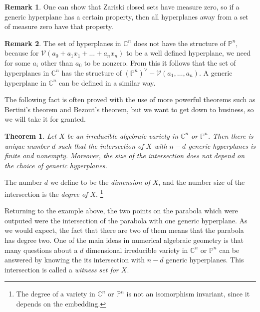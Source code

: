 \documentclass[12pt]{article}
\newtheorem{theorem}{Theorem}[section]
\theoremstyle{definition}
\newtheorem{remark}{Remark}[section]
\newcommand{\C}{\mathbb{C}}
\newcommand{\PP}{\mathbb{P}}
\begin{document}
\begin{remark}
   One can show that Zariski closed sets have measure zero, so if a 
   generic hyperplane has a certain property, then all hyperplanes away 
   from a set of measure zero have that property.
\end{remark}
\begin{remark}
   The set of hyperplanes in $\C^n$ does not have the structure of 
   $\PP^n$, because for $\mathcal{V}(a_0 + a_1x_1 + \ldots + a_nx_n)$ to 
   be a well defined hyperplane, we need for some $a_i$ other than $a_0$ 
   to be nonzero. From this it follows that the set of hyperplanes in 
   $\C^n$ has the structure of $(\PP^n)^\vee - \mathcal{V}(a_1, \ldots, 
   a_n)$. A generic hyperplane in $\C^n$ can be defined in a similar 
   way.
\end{remark}

The following fact is often proved with the use of more powerful 
theorems such as Bertini's theorem and Bezout's theorem, but we want to 
get down to business, so we will take it for granted.

\begin{theorem}
   Let $X$ be an irreducible algebraic variety in $\C^n$ or $\PP^n$. 
   Then there is unique number $d$ such that the intersection of $X$ 
   with $n-d$ generic hyperplanes is finite and nonempty. Moreover, the 
   size of the intersection does not depend on the choice of generic 
   hyperplanes.
\end{theorem}

The number $d$ we define to be the \emph{dimension of $X$}, and the number size 
of the intersection is the \emph{degree of $X$}. \footnote{The degree of 
a variety in $\C^n$ or $\PP^n$ is not an isomorphism invariant, since it 
depends on the embedding.}

Returning to the example above, the two points on the parabola which 
were outputed were the intersection of the parabola with one generic 
hyperplane. As we would expect, the fact that there are two of them 
means that the parabola has degree two. One of the main ideas 
in numerical algebraic geometry is that many questions about a $d$ 
dimensional irreducible variety in $\C^n$ or $\PP^n$ can be answered by knowing the 
its intersection with $n-d$ generic hyperplanes. This intersection is 
called a \emph{witness set for $X$}. 

\end{document}
